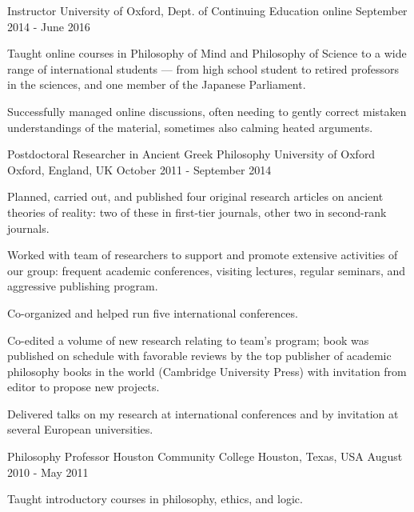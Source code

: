 \begin{cventries}
  \cventry
    {Instructor} %
    {University of Oxford, Dept. of Continuing Education} %
    {online} %
    {September 2014 - June 2016} %
    {
      \begin{cvitems} %
        \item {Taught online courses in Philosophy of Mind and Philosophy of Science to a wide range of international students --- from high school student to retired professors in the sciences, and one member of the Japanese Parliament.}
        \item {Successfully managed online discussions, often needing to gently correct mistaken understandings of the material, sometimes also calming heated arguments.}
        \end{cvitems}
    }
  \cventry
    {Postdoctoral Researcher in Ancient Greek Philosophy} %
    {University of Oxford} %
    {Oxford, England, UK} %
    {October 2011 - September 2014} %
    {
      \begin{cvitems} %
        \item {Planned, carried out, and published four original research articles on ancient theories of reality:  two of these in first-tier journals, other two in second-rank journals.}
        \item {Worked with team of researchers to support and promote extensive activities of our group:  frequent academic conferences, visiting lectures, regular seminars, and aggressive publishing program.}
        \item {Co-organized and helped run five international conferences.}
        \item {Co-edited a volume of new research relating to team's program; book was published on schedule with favorable reviews by the top publisher of academic philosophy books in the world (Cambridge University Press) with invitation from editor to propose new projects.}
        \item {Delivered talks on my research at international conferences and by invitation at several European universities.}
      \end{cvitems}
    }
    
  \cventry
    {Philosophy Professor} %
    {Houston Community College} %
    {Houston, Texas, USA} %
    {August 2010 - May 2011} %
    {
      \begin{cvitems} %
        \item {Taught introductory courses in philosophy, ethics, and logic.}
	    \end{cvitems}
      }


\end{cventries}
